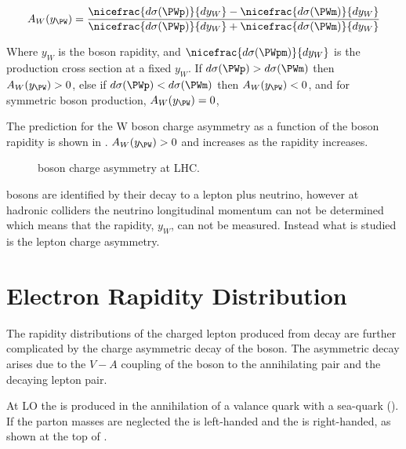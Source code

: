 \begin{equation}
  A_{W}(y_{\PW})=
    \frac{ 
      \nicefrac{ d\sigma (\PWp) }{ dy_{W} } -
      \nicefrac{ d\sigma (\PWm) }{ dy_{W} }
    }
    {
      \nicefrac{ d\sigma (\PWp) }{ dy_{W} } +
      \nicefrac{ d\sigma (\PWm) }{ dy_{W} }
    }
\label{wbos:wasym}
\end{equation} 

Where $y_{W}$ is the boson rapidity, and 
$\nicefrac{ d\sigma (\PWpm) }{ dy_{W} }$ is the \PWpm production cross section
at a fixed $y_{W}$.  
If $d\sigma(\PWp) > d\sigma(\PWm) $ then $A_{W}(y_{\PW})> 0$,
else if $d\sigma(\PWp) < d\sigma(\PWm) $ then $A_{W}(y_{\PW})< 0$,
and for symmetric \PWpm boson production, $A_{W}(y_{\PW})= 0$,

The prediction for the W boson charge asymmetry as a function of the boson
rapidity is shown in . $A_{W}(y_{\PW})> 0$ and
increases as the rapidity increases.

\begin{figure}[htb]
  \centering
  \caption{\PW boson charge asymmetry at LHC.}
  \label{wbos:chargeasym}
\end{figure}

\PW bosons are identified by their decay to a lepton plus neutrino, however at
hadronic colliders the neutrino longitudinal momentum can not be determined
which means that the \PW rapidity, $y_{W}$, can not be measured.  Instead what
is studied is the lepton charge asymmetry.


\section{Electron Rapidity Distribution}

The rapidity distributions of the charged lepton produced from \PW decay are
further complicated by the charge asymmetric decay of the \PWpm boson. 
The asymmetric decay arises due to the $V-A$ coupling of the \PW boson to the
annihilating \HepProcess{\Pquark\APquark} pair and the decaying lepton pair.

At \ac{LO} the \PWp is produced in the annihilation of a \Pup valance quark
with a \APdown sea-quark (). 
If the parton masses are neglected the \Pup is left-handed and the \APdown is
right-handed, as shown at the top of . 

